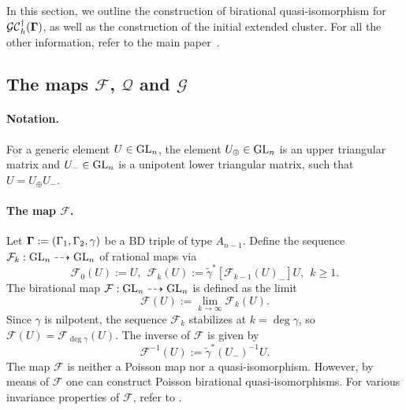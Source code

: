 In this section, we outline the construction of birational quasi-isomorphism for $\mathcal{GC}_h^{\dagger}(\mathbf{\Gamma})$, as well as the construction of the initial extended cluster. For all the other information, refer to the main paper~\cite{multdual}.

\subsection{The maps $\mathcal{F}$, $\mathcal{Q}$ and $\mathcal{G}$}

\paragraph{Notation.} For a generic element $U \in \operatorname{GL}_n$, the element $U_\oplus \in \operatorname{GL}_n$ is an upper triangular matrix and $U_-\in \operatorname{GL}_n$ is a unipotent lower triangular matrix, such that $U = U_\oplus U_-$.

\paragraph{The map $\mathcal{F}$.}  Let $\mathbf{\Gamma} := (\Gamma_1,\Gamma_2,\gamma)$ be a BD triple of type $A_{n-1}$. Define the sequence $\mathcal{F}_k:\operatorname{GL}_n\dashrightarrow \operatorname{GL}_n$ of rational maps via
\begin{equation}
    \mathcal{F}_0(U):= U, \ \ \mathcal{F}_k(U):= \tilde{\gamma}^*[\mathcal{F}_{k-1}(U)_-]U, \ \ k \geq 1.
\end{equation}
The birational map $\mathcal{F}:\operatorname{GL}_n \dashrightarrow \operatorname{GL}_n$ is defined as the limit 
\begin{equation}
    \mathcal{F}(U):= \lim_{k \rightarrow \infty} \mathcal{F}_k(U).
\end{equation}
Since $\gamma$ is nilpotent, the sequence $\mathcal{F}_k$ stabilizes at $k = \deg \gamma$, so $\mathcal{F}(U) = \mathcal{F}_{\deg \gamma}(U)$. The inverse of $\mathcal{F}$ is given by
\begin{equation}
    \mathcal{F}^{-1}(U):= \tilde{\gamma}^*(U_-)^{-1}U.
\end{equation}
The map $\mathcal{F}$ is neither a Poisson map nor a quasi-isomorphism. However, by means of $\mathcal{F}$ one can construct Poisson birational quasi-isomorphisms. For various invariance properties of $\mathcal{F}$, refer to \cite[Section 4.2]{multdual}.


